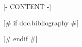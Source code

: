\documentclass[a4paper,12pt,twoside]{book} %
\begin{document}
\sloppy  %

\frontmatter
\maketitle
\tableofcontents

\mainmatter  %


[- CONTENT -]


[# if doc.bibliography #]

[# endif #]
\end{document}
